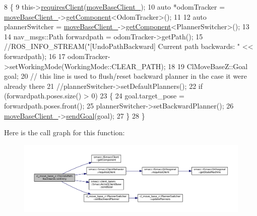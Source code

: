 \begin{DoxyCode}
8 \{
9     this->\hyperlink{classsmacc_1_1SmaccClientBehavior_a917f001e763a1059af337bf4e164f542}{requiresClient}(\hyperlink{classcl__move__base__z_1_1CbUndoPathBackwards_a306d616dab00f50141abed4bfb47aeb2}{moveBaseClient\_});
10     \textcolor{keyword}{auto} *odomTracker = \hyperlink{classcl__move__base__z_1_1CbUndoPathBackwards_a306d616dab00f50141abed4bfb47aeb2}{moveBaseClient\_}->\hyperlink{classsmacc_1_1ISmaccClient_adef78db601749ca63c19e74a27cb88cc}{getComponent}<OdomTracker>();
11 
12     \textcolor{keyword}{auto} plannerSwitcher = \hyperlink{classcl__move__base__z_1_1CbUndoPathBackwards_a306d616dab00f50141abed4bfb47aeb2}{moveBaseClient\_}->\hyperlink{classsmacc_1_1ISmaccClient_adef78db601749ca63c19e74a27cb88cc}{getComponent}<PlannerSwitcher>();
13 
14     nav\_msgs::Path forwardpath = odomTracker->getPath();
15     \textcolor{comment}{//ROS\_INFO\_STREAM("[UndoPathBackward] Current path backwards: " << forwardpath);}
16 
17     odomTracker->setWorkingMode(WorkingMode::CLEAR\_PATH);
18 
19     ClMoveBaseZ::Goal goal;
20     \textcolor{comment}{// this line is used to flush/reset backward planner in the case it were already there}
21     \textcolor{comment}{//plannerSwitcher->setDefaultPlanners();}
22     \textcolor{keywordflow}{if} (forwardpath.poses.size() > 0)
23     \{
24         goal.target\_pose = forwardpath.poses.front();
25         plannerSwitcher->setBackwardPlanner();
26         \hyperlink{classcl__move__base__z_1_1CbUndoPathBackwards_a306d616dab00f50141abed4bfb47aeb2}{moveBaseClient\_}->\hyperlink{classsmacc_1_1client__bases_1_1SmaccActionClientBase_a9c47a5094ac8afb01680307fe5eca922}{sendGoal}(goal);
27     \}
28 \}
\end{DoxyCode}


Here is the call graph for this function\+:
\nopagebreak
\begin{figure}[H]
\begin{center}
\leavevmode
\includegraphics[width=350pt]{classcl__move__base__z_1_1CbUndoPathBackwards_a32e680530375b62c7053bf173f6b2b1b_cgraph}
\end{center}
\end{figure}


